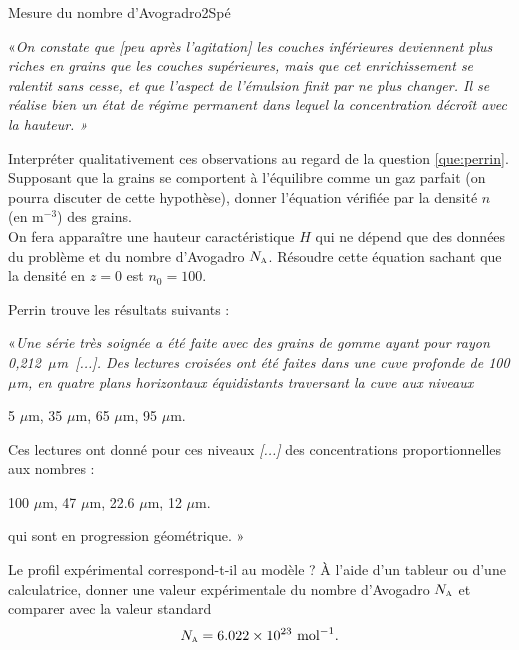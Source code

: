 \begin{exercise}{Mesure du nombre d'Avogradro}{2}{Spé}
\begin{questions}
\begin{EnvUplevel}
\begin{center}\begin{minipage}{155mm}
    «\itshape On constate que \emph{[peu après l'agitation]} les couches inférieures deviennent  plus  riches  en grains  que  les  couches  supérieures,  mais  que  cet  enrichissement  se ralentit sans cesse, et que l’aspect de l’émulsion finit par ne plus changer. Il se réalise bien un état de régime permanent dans lequel la concentration décroît avec la hauteur. \normalfont »
\end{minipage}\end{center}
\end{EnvUplevel}
    \question Interpréter qualitativement ces observations au regard de la question \ref{que:perrin}.
    \question Supposant que la grains se comportent à l'équilibre comme un gaz parfait (on pourra discuter de cette hypothèse), donner l'équation vérifiée par la densité $n$ (en m$^{-3}$) des grains. \\
    On fera apparaître une hauteur caractéristique $H$ qui ne dépend que des données du problème et du nombre d'Avogadro $N_\textsc{a}$.
    \question Résoudre cette équation sachant que la densité en $z = 0$ est $n_0 = 100$.
\begin{EnvUplevel}
Perrin trouve les résultats suivants :
\begin{center}\begin{minipage}{155mm}
    «\itshape Une série très soignée a été faite avec des grains de gomme ayant pour rayon 0,212~$\mu$m~\emph{[...]}.
    Des lectures croisées ont été faites dans une cuve profonde de 100 $\mu$m, en quatre plans horizontaux équidistants traversant la cuve aux niveaux
    \begin{center}
        5 $\mu$m, 35 $\mu$m, 65 $\mu$m, 95 $\mu$m.
    \end{center}
    Ces lectures ont donné pour ces niveaux \emph{[...]} des concentrations proportionnelles aux nombres :
    \begin{center}
        100 $\mu$m, 47 $\mu$m, 22.6 $\mu$m, 12 $\mu$m.
    \end{center}
    qui sont en progression géométrique. \normalfont »
\end{minipage}\end{center}\end{EnvUplevel}
    \question Le profil expérimental correspond-t-il au modèle ? \`A l'aide d'un tableur ou d'une calculatrice, donner une valeur expérimentale du nombre d'Avogadro $N_\textsc{a}$ et comparer avec la valeur standard
    $$N_\textsc{a} = 6.022\times 10^{23} \text{ mol}^{-1}.$$
\end{questions}


\end{exercise}
